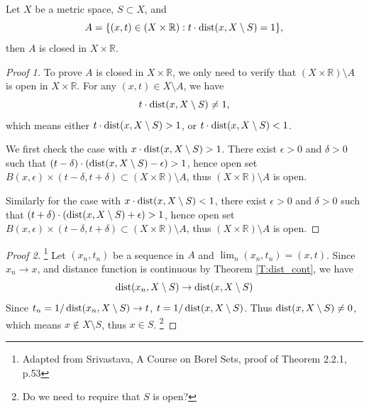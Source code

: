 \begin{lemma} \label{L:prod_clos}
Let $X$ be a metric space, $S\subset X$, and
\[
  A = \{ (x,t)\in (X\times \mathbb{R}): t \cdot \operatorname*{dist}(x,X\setminus S) = 1 \},
\]
then $A$ is closed in $X\times\mathbb{R}$.
\end{lemma}
\begin{proof}[Proof 1]
To prove $A$ is closed in $X\times\mathbb{R}$, we only need to 
verify that $(X\times\mathbb{R})\setminus A$ is open in $X\times\mathbb{R}$.
For any $(x,t)\in X\setminus A$, we have
\[
  t \cdot \operatorname*{dist}(x,X\setminus S) \neq 1,
\]
which means either $t \cdot \operatorname*{dist}(x,X\setminus S) > 1$, or 
$t \cdot \operatorname*{dist}(x,X\setminus S) < 1$.

We first check the case with $x \cdot \operatorname*{dist}(x,X\setminus S) > 1$. There exist
$\epsilon>0$ and $\delta>0$ such that
$(t-\delta) \cdot (\operatorname*{dist}(x,X\setminus S)-\epsilon) > 1$, hence open set
$B(x,\epsilon)\times (t-\delta,t+\delta)\subset (X\times\mathbb{R})\setminus A$,
thus $(X\times\mathbb{R})\setminus A$ is open.

Similarly for the case with $x \cdot \operatorname*{dist}(x,X\setminus S) < 1$, there exist
$\epsilon>0$ and $\delta>0$ such that
$(t+\delta) \cdot (\operatorname*{dist}(x,X\setminus S)+\epsilon) > 1$, hence open set
$B(x,\epsilon)\times (t-\delta,t+\delta)\subset (X\times\mathbb{R})\setminus A$,
thus $(X\times\mathbb{R})\setminus A$ is open.
\end{proof}
\begin{proof}[Proof 2]
  \footnote{Adapted from Srivastava, A Course on Borel Sets, proof of 
    Theorem 2.2.1, p.53 }
Let $(x_n,t_n)$ be a sequence in $A$ and $\lim_n (x_n,t_n)=(x,t)$.
Since $x_n\to x$, and distance function is continuous by Theorem \ref{T:dist_cont},
we have
\[
  \operatorname*{dist}(x_n,X\setminus S)\to \operatorname*{dist}(x,X\setminus S)
\]
Since  $t_n = 1 / \operatorname*{dist}(x_n,X\setminus S)\to t$, 
$t = 1 / \operatorname*{dist}(x,X\setminus S)$. Thus $\operatorname*{dist}(x,X\setminus S)\neq 0$,
which means $x\notin X\setminus S$, thus $x\in S$.
\footnote{Do we need to require that $S$ is open?}


\end{proof}



